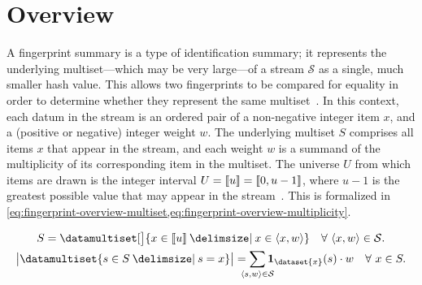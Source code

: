 \section{Overview}
\label{sec:fingerprint-overview}

A fingerprint summary is a type of identification summary; it represents the underlying multiset---which may be very large---of a stream \( \mathcal{S} \) as a single, much smaller hash value.
This allows two fingerprints to be compared for equality in order to determine whether they represent the same multiset~\citep{breslauer11}.
In this context, each datum in the stream is an ordered pair of a non-negative integer item \( x \), and a (positive or negative) integer weight \( w \).
The underlying multiset \( S \) comprises all items \( x \) that appear in the stream, and each weight \( w \) is a summand of the multiplicity of its corresponding item in the multiset.
The universe \( U \) from which items are drawn is the integer interval \( U = \llbracket u\rrbracket = \llbracket0, u - 1\rrbracket \), where \( u - 1 \) is the greatest possible value that may appear in the stream~\citep{cormode20}.
This is formalized in \cref{eq:fingerprint-overview-multiset,eq:fingerprint-overview-multiplicity}.

\begin{gather}
  \label{eq:fingerprint-overview-multiset}
  S = \datamultiset[\big]{x \in \dataintegerinterval{u} \suchthat x \in \datasequence{x, w}} \quad \forall\ \datasequence{x, w} \in \mathcal{S}. \\
  \label{eq:fingerprint-overview-multiplicity}
  \cardinality[\big]{\datamultiset{s \in S \suchthat s = x}} = \smashoperator{\sum_{\datasequence{s, w} \in \mathcal{S}}} \indicator_{\dataset{x}} (s) \cdot w \quad \forall\ x \in S.
\end{gather}

